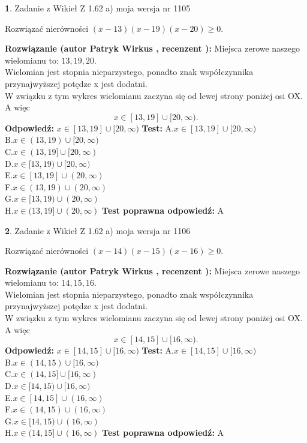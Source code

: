 \documentclass[12pt, a4paper]{article}
\theoremstyle{definition} %
\newtheorem{zad}{}
\newcommand{\zadStart}[1]{\begin{zad}#1\newline}
\newcommand{\zadStop}{\end{zad}}
\newcommand{\rozwStart}[2]{\noindent \textbf{Rozwiązanie (autor #1 , recenzent #2): }\newline}
\newcommand{\rozwStop}{\newline}
\newcommand{\odpStart}{\noindent \textbf{Odpowiedź:}\newline}
\newcommand{\odpStop}{\newline}
\newcommand{\testStart}{\noindent \textbf{Test:}\newline}
\newcommand{\testStop}{\newline}
\newcommand{\kluczStart}{\noindent \textbf{Test poprawna odpowiedź:}\newline}
\newcommand{\kluczStop}{\newline}
\begin{document}
\zadStart{Zadanie z Wikieł Z 1.62 a) moja wersja nr 1105}

Rozwiązać nierówności $(x-13)(x-19)(x-20)\ge0$.
\zadStop
\rozwStart{Patryk Wirkus}{}
Miejsca zerowe naszego wielomianu to: $13, 19, 20$.\\
Wielomian jest stopnia nieparzystego, ponadto znak współczynnika przy\linebreak najwyższej potędze x jest dodatni.\\ W związku z tym wykres wielomianu zaczyna się od lewej strony poniżej osi OX. A więc $$x \in [13,19] \cup [20,\infty).$$
\rozwStop
\odpStart
$x \in [13,19] \cup [20,\infty)$
\odpStop
\testStart
A.$x \in [13,19] \cup [20,\infty)$\\
B.$x \in (13,19) \cup [20,\infty)$\\
C.$x \in (13,19] \cup [20,\infty)$\\
D.$x \in [13,19) \cup [20,\infty)$\\
E.$x \in [13,19] \cup (20,\infty)$\\
F.$x \in (13,19) \cup (20,\infty)$\\
G.$x \in [13,19) \cup (20,\infty)$\\
H.$x \in (13,19] \cup (20,\infty)$
\testStop
\kluczStart
A
\kluczStop



\zadStart{Zadanie z Wikieł Z 1.62 a) moja wersja nr 1106}

Rozwiązać nierówności $(x-14)(x-15)(x-16)\ge0$.
\zadStop
\rozwStart{Patryk Wirkus}{}
Miejsca zerowe naszego wielomianu to: $14, 15, 16$.\\
Wielomian jest stopnia nieparzystego, ponadto znak współczynnika przy\linebreak najwyższej potędze x jest dodatni.\\ W związku z tym wykres wielomianu zaczyna się od lewej strony poniżej osi OX. A więc $$x \in [14,15] \cup [16,\infty).$$
\rozwStop
\odpStart
$x \in [14,15] \cup [16,\infty)$
\odpStop
\testStart
A.$x \in [14,15] \cup [16,\infty)$\\
B.$x \in (14,15) \cup [16,\infty)$\\
C.$x \in (14,15] \cup [16,\infty)$\\
D.$x \in [14,15) \cup [16,\infty)$\\
E.$x \in [14,15] \cup (16,\infty)$\\
F.$x \in (14,15) \cup (16,\infty)$\\
G.$x \in [14,15) \cup (16,\infty)$\\
H.$x \in (14,15] \cup (16,\infty)$
\testStop
\kluczStart
A
\kluczStop
\end{document}
